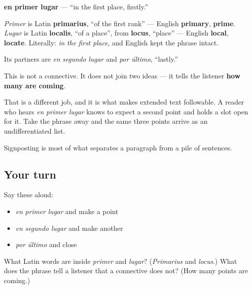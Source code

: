 \begin{cousinweb}
\textbf{en primer lugar} — \textquotedblleft{}in the first place, firstly.\textquotedblright{}

\emph{Primer} is Latin \textbf{primarius}, \textquotedblleft{}of the first rank\textquotedblright{} — English \textbf{primary}, \textbf{prime}. \emph{Lugar} is Latin \textbf{localis}, \textquotedblleft{}of a place\textquotedblright{}, from \textbf{locus}, \textquotedblleft{}place\textquotedblright{} — English \textbf{local}, \textbf{locate}. Literally: \emph{in the first place}, and English kept the phrase intact.

Its partners are \emph{en segundo lugar} and \emph{por último}, \textquotedblleft{}lastly.\textquotedblright{}
\end{cousinweb}

\begin{grammarlens}[title={What you've built}]
This is not a connective. It does not join two ideas — it tells the listener \textbf{how many are coming}.

That is a different job, and it is what makes extended text followable. A reader who hears \emph{en primer lugar} knows to expect a second point and holds a slot open for it. Take the phrase away and the same three points arrive as an undifferentiated list.

Signposting is most of what separates a paragraph from a pile of sentences.
\end{grammarlens}

\subsection*{Your turn}
Say these aloud:

\begin{itemize}
\raggedright
  \item \emph{en primer lugar} and make a point
  \item \emph{en segundo lugar} and make another
  \item \emph{por último} and close
\end{itemize}

\begin{tcolorbox}[breakable,colback=teal!4,colframe=teal!35!black,title={Before you move on}]
What Latin words are inside \emph{primer} and \emph{lugar}? (\emph{Primarius} and \emph{locus}.) What does the phrase tell a listener that a connective does not? (How many points are coming.)
\end{tcolorbox}
